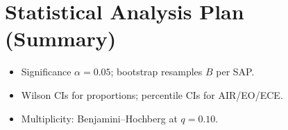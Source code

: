 
\section{Statistical Analysis Plan (Summary)}
\begin{itemize}[leftmargin=*]
\item Significance $\alpha=0.05$; bootstrap resamples $B$ per SAP.
\item Wilson CIs for proportions; percentile CIs for AIR/EO/ECE.
\item Multiplicity: Benjamini--Hochberg at $q=0.10$.
\end{itemize}
